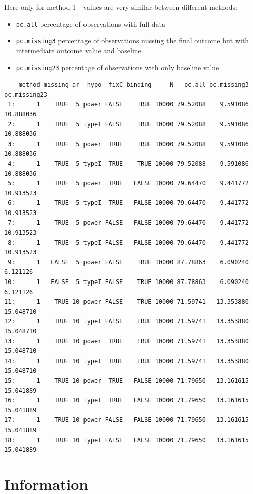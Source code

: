 \documentclass[12pt]{article}
\begin{document}
Here only for method 1 - values are very similar between different
methods:
\begin{itemize}
\item \texttt{pc.all} percentage of observations with full data
\item \texttt{pc.missing3} percentage of observations missing the final outcome
but with intermediate outcome value and baseline.
\item \texttt{pc.missing23} percentage of observations with only baseline value
\end{itemize}
\begin{verbatim}
    method missing ar  hypo  fixC binding     N   pc.all pc.missing3 pc.missing23
 1:      1    TRUE  5 power FALSE    TRUE 10000 79.52088    9.591086    10.888036
 2:      1    TRUE  5 typeI FALSE    TRUE 10000 79.52088    9.591086    10.888036
 3:      1    TRUE  5 power  TRUE    TRUE 10000 79.52088    9.591086    10.888036
 4:      1    TRUE  5 typeI  TRUE    TRUE 10000 79.52088    9.591086    10.888036
 5:      1    TRUE  5 power  TRUE   FALSE 10000 79.64470    9.441772    10.913523
 6:      1    TRUE  5 typeI  TRUE   FALSE 10000 79.64470    9.441772    10.913523
 7:      1    TRUE  5 power FALSE   FALSE 10000 79.64470    9.441772    10.913523
 8:      1    TRUE  5 typeI FALSE   FALSE 10000 79.64470    9.441772    10.913523
 9:      1   FALSE  5 power FALSE    TRUE 10000 87.78863    6.090240     6.121126
10:      1   FALSE  5 typeI FALSE    TRUE 10000 87.78863    6.090240     6.121126
11:      1    TRUE 10 power FALSE    TRUE 10000 71.59741   13.353880    15.048710
12:      1    TRUE 10 typeI FALSE    TRUE 10000 71.59741   13.353880    15.048710
13:      1    TRUE 10 power  TRUE    TRUE 10000 71.59741   13.353880    15.048710
14:      1    TRUE 10 typeI  TRUE    TRUE 10000 71.59741   13.353880    15.048710
15:      1    TRUE 10 power  TRUE   FALSE 10000 71.79650   13.161615    15.041889
16:      1    TRUE 10 typeI  TRUE   FALSE 10000 71.79650   13.161615    15.041889
17:      1    TRUE 10 power FALSE   FALSE 10000 71.79650   13.161615    15.041889
18:      1    TRUE 10 typeI FALSE   FALSE 10000 71.79650   13.161615    15.041889
\end{verbatim}

\clearpage

\section{Information}
\label{sec:org2893723}
\end{document}
